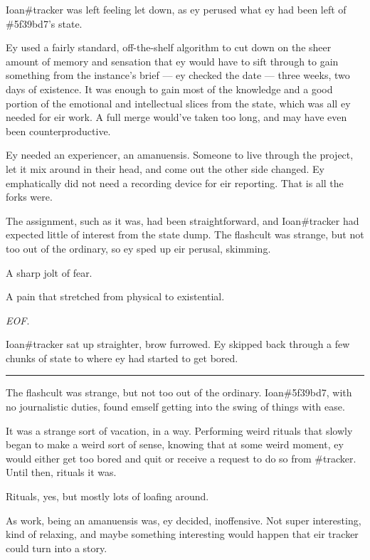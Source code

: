 Ioan\#tracker was left feeling let down, as ey perused what ey had been left of \#5f39bd7's state.

Ey used a fairly standard, off-the-shelf algorithm to cut down on the sheer amount of memory and sensation that ey would have to sift through to gain something from the instance's brief --- ey checked the date --- three weeks, two days of existence. It was enough to gain most of the knowledge and a good portion of the emotional and intellectual slices from the state, which was all ey needed for eir work. A full merge would've taken too long, and may have even been counterproductive.

Ey needed an experiencer, an amanuensis. Someone to live through the project, let it mix around in their head, and come out the other side changed. Ey emphatically did not need a recording device for eir reporting. That is all the forks were.

The assignment, such as it was, had been straightforward, and Ioan\#tracker had expected little of interest from the state dump. The flashcult was strange, but not too out of the ordinary, so ey sped up eir perusal, skimming.

A sharp jolt of fear.

A pain that stretched from physical to existential.

\emph{EOF}.

Ioan\#tracker sat up straighter, brow furrowed. Ey skipped back through a few chunks of state to where ey had started to get bored.

\begin{center}\rule{0.5\linewidth}{\linethickness}\end{center}

The flashcult was strange, but not too out of the ordinary. Ioan\#5f39bd7, with no journalistic duties, found emself getting into the swing of things with ease.

It was a strange sort of vacation, in a way. Performing weird rituals that slowly began to make a weird sort of sense, knowing that at some weird moment, ey would either get too bored and quit or receive a request to do so from \#tracker. Until then, rituals it was.

Rituals, yes, but mostly lots of loafing around.

As work, being an amanuensis was, ey decided, inoffensive. Not super interesting, kind of relaxing, and maybe something interesting would happen that eir tracker could turn into a story.


